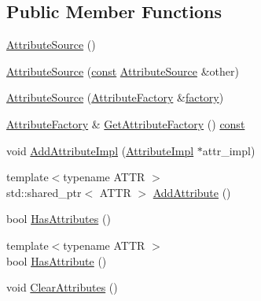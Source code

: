 \subsection*{Public Member Functions}
\begin{DoxyCompactItemize}
\item 
\mbox{\hyperlink{classlucene_1_1core_1_1util_1_1AttributeSource_aef30fddd7e976cf96938778e73ebba1f}{Attribute\+Source}} ()
\item 
\mbox{\hyperlink{classlucene_1_1core_1_1util_1_1AttributeSource_a46285603ecad877610be674c124fd632}{Attribute\+Source}} (\mbox{\hyperlink{ZlibCrc32_8h_a2c212835823e3c54a8ab6d95c652660e}{const}} \mbox{\hyperlink{classlucene_1_1core_1_1util_1_1AttributeSource}{Attribute\+Source}} \&other)
\item 
\mbox{\hyperlink{classlucene_1_1core_1_1util_1_1AttributeSource_a3111b8c073c694240c1797420c7031a3}{Attribute\+Source}} (\mbox{\hyperlink{classlucene_1_1core_1_1util_1_1AttributeFactory}{Attribute\+Factory}} \&\mbox{\hyperlink{classlucene_1_1core_1_1util_1_1AttributeSource_a1376420a752f337a0fdb582bdf160eba}{factory}})
\item 
\mbox{\hyperlink{classlucene_1_1core_1_1util_1_1AttributeFactory}{Attribute\+Factory}} \& \mbox{\hyperlink{classlucene_1_1core_1_1util_1_1AttributeSource_ab361967a0235e8d9f1afab451d5d2e99}{Get\+Attribute\+Factory}} () \mbox{\hyperlink{ZlibCrc32_8h_a2c212835823e3c54a8ab6d95c652660e}{const}}
\item 
void \mbox{\hyperlink{classlucene_1_1core_1_1util_1_1AttributeSource_a5aeee12f7ccd43874a1bc2447f3e54ac}{Add\+Attribute\+Impl}} (\mbox{\hyperlink{classlucene_1_1core_1_1util_1_1AttributeImpl}{Attribute\+Impl}} $\ast$attr\+\_\+impl)
\item 
{\footnotesize template$<$typename A\+T\+TR $>$ }\\std\+::shared\+\_\+ptr$<$ A\+T\+TR $>$ \mbox{\hyperlink{classlucene_1_1core_1_1util_1_1AttributeSource_af07d54141811dd0711441530dffc5e8f}{Add\+Attribute}} ()
\item 
bool \mbox{\hyperlink{classlucene_1_1core_1_1util_1_1AttributeSource_a885ff0d539fc9d2763412c18f5c19097}{Has\+Attributes}} ()
\item 
{\footnotesize template$<$typename A\+T\+TR $>$ }\\bool \mbox{\hyperlink{classlucene_1_1core_1_1util_1_1AttributeSource_a214d5ca7edcf7bed74db8d73c73f9802}{Has\+Attribute}} ()
\item 
void \mbox{\hyperlink{classlucene_1_1core_1_1util_1_1AttributeSource_a7c2b117da3dac9f29017a5bb5562d6de}{Clear\+Attributes}} ()

\end{DoxyCompactItemize}

